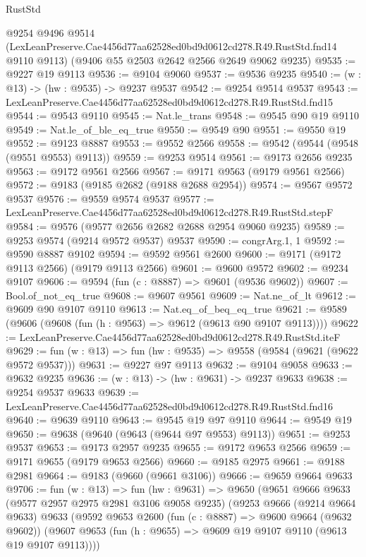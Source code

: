 \begin{lexlean}{RustStd}
\begin{coremodule}
  @9254
    @9496
    @9514
    (LexLeanPreserve.Cae4456d77aa62528ed0bd9d0612cd278.R49.RustStd.fnd14 @9110 @9113)
    (@9406 @55 @2503 @2642 @2566 @2649 @9062 @9235)
@9535 := @9227 @19 @9113
@9536 := @9104 @9060
@9537 := @9536 @9235
@9540 := (w : @13) -> (hw : @9535) -> @9237 @9537
@9542 := @9254 @9514 @9537
@9543 := LexLeanPreserve.Cae4456d77aa62528ed0bd9d0612cd278.R49.RustStd.fnd15
@9544 := @9543 @9110
@9545 := Nat.le_trans
@9548 := @9545 @90 @19 @9110
@9549 := Nat.le_of_ble_eq_true
@9550 := @9549 @90
@9551 := @9550 @19
@9552 := @9123 @8887
@9553 := @9552 @2566
@9558 := @9542 (@9544 (@9548 (@9551 @9553) @9113))
@9559 := @9253 @9514
@9561 := @9173 @2656 @9235
@9563 := @9172 @9561 @2566
@9567 := @9171 @9563 (@9179 @9561 @2566)
@9572 := @9183 (@9185 @2682 (@9188 @2688 @2954))
@9574 := @9567 @9572 @9537
@9576 := @9559 @9574 @9537
@9577 := LexLeanPreserve.Cae4456d77aa62528ed0bd9d0612cd278.R49.RustStd.stepF
@9584 := @9576 (@9577 @2656 @2682 @2688 @2954 @9060 @9235)
@9589 := @9253 @9574 (@9214 @9572 @9537) @9537
@9590 := congrArg.{1, 1}
@9592 := @9590 @8887 @9102
@9594 := @9592 @9561 @2600
@9600 := @9171 (@9172 @9113 @2566) (@9179 @9113 @2566)
@9601 := @9600 @9572
@9602 := @9234 @9107
@9606 := @9594 (fun (c : @8887) => @9601 (@9536 @9602))
@9607 := Bool.of_not_eq_true
@9608 := @9607 @9561
@9609 := Nat.ne_of_lt
@9612 := @9609 @90 @9107 @9110
@9613 := Nat.eq_of_beq_eq_true
@9621 := @9589 (@9606 (@9608 (fun (h : @9563) => @9612 (@9613 @90 @9107 @9113))))
@9622 := LexLeanPreserve.Cae4456d77aa62528ed0bd9d0612cd278.R49.RustStd.iteF
@9629 := fun (w : @13) => fun (hw : @9535) => @9558 (@9584 (@9621 (@9622 @9572 @9537)))
@9631 := @9227 @97 @9113
@9632 := @9104 @9058
@9633 := @9632 @9235
@9636 := (w : @13) -> (hw : @9631) -> @9237 @9633
@9638 := @9254 @9537 @9633
@9639 := LexLeanPreserve.Cae4456d77aa62528ed0bd9d0612cd278.R49.RustStd.fnd16
@9640 := @9639 @9110
@9643 := @9545 @19 @97 @9110
@9644 := @9549 @19
@9650 := @9638 (@9640 (@9643 (@9644 @97 @9553) @9113))
@9651 := @9253 @9537
@9653 := @9173 @2957 @9235
@9655 := @9172 @9653 @2566
@9659 := @9171 @9655 (@9179 @9653 @2566)
@9660 := @9185 @2975
@9661 := @9188 @2981
@9664 := @9183 (@9660 (@9661 @3106))
@9666 := @9659 @9664 @9633
@9706 := fun (w : @13) =>
  fun (hw : @9631) =>
  @9650
    (@9651
      @9666
      @9633
      (@9577 @2957 @2975 @2981 @3106 @9058 @9235)
      (@9253
        @9666
        (@9214 @9664 @9633)
        @9633
        (@9592
          @9653
          @2600
          (fun (c : @8887) => @9600 @9664 (@9632 @9602))
          (@9607 @9653 (fun (h : @9655) => @9609 @19 @9107 @9110 (@9613 @19 @9107 @9113))))

\end{coremodule}
\end{lexlean}
